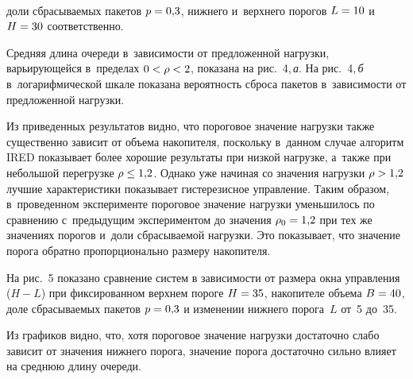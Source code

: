 \begin{figure*} %
\vspace*{1pt}
  \begin{center}  
    \mbox{%
\epsfxsize=160.278mm
}

\end{center}
\vspace*{-6pt}
\end{figure*}


\begin{multicols}{2}

\noindent
 доли сбрасываемых пакетов $p\hm= 0{,}3$, нижнего и~верхнего 
порогов $L\hm= 10$ и~$H\hm= 30$ со\-от\-вет\-ст\-венно. 

Средняя длина очереди 
в~за\-ви\-си\-мости от предложенной нагрузки, варьирующейся в~пределах  $0\hm<\rho \hm< 2$, 
показана на рис.~4,\,\textit{а}. 
%
На рис.~4,\,\textit{б} в~логарифмической шкале показана 
вероятность сброса пакетов в~за\-ви\-си\-мости от предложенной на\-грузки. 
{

}

Из приведенных 
результатов видно, что пороговое значение нагрузки также существенно зависит от 
объема накопителя, поскольку в~данном случае алгоритм IRED показывает более 
хорошие результаты при низкой нагрузке, а~также при небольшой перегрузке $\rho\hm\leq 
1{,}2$. Однако уже начиная со значения нагрузки $\rho \hm> 1{,}2$ лучшие 
характеристики показывает гистерезисное управ\-ле\-ние. Таким образом, в~проведенном 
эксперименте пороговое значение нагрузки уменьшилось по сравнению с~предыду\-щим 
экспериментом до значения $\rho_0\hm= 1{,}2$ при тех же значениях порогов и~доли 
сбрасываемой нагрузки. Это показывает, что значение порога обратно пропорционально 
размеру накопителя.
   

   На рис.~5 показано сравнение систем в зависимости от размера окна управления ($H-L$) 
   при фиксированном верхнем пороге $H\hm= 35$, накопителе объема $B\hm=40$, доле 
сбрасываемых пакетов $p\hm= 0{,}3$ и изменении нижнего порога~$L$ от~5 до~35. 

Из 
графиков видно, что, хотя пороговое значение нагрузки достаточно слабо зависит от 
значения нижнего порога, значение порога достаточно сильно влияет на среднюю длину 
очереди. 
   
\begin{figure*} %
\vspace*{1pt}
  \begin{center}  
    \mbox{%
\epsfxsize=160.311mm
}


\end{center}
\end{figure*}
\end{multicols}

